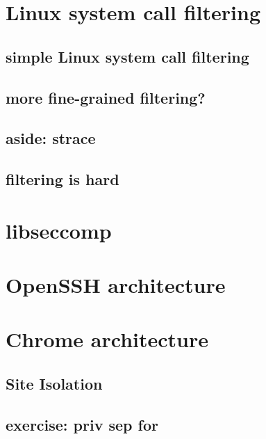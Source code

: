 \section{Linux system call filtering}
\subsection{simple Linux system call filtering}


\subsection{more fine-grained filtering?}




\subsection{aside: strace}


\subsection{filtering is hard}


\section{libseccomp}



\section{OpenSSH architecture}


\section{Chrome architecture}


\subsection{Site Isolation}


\subsection{exercise: priv sep for}



